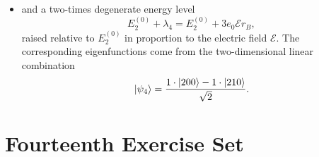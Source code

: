 \documentclass[11pt, a4paper]{article}
\newcommand{\p}{\psi}  %
\newcommand{\E}{\mathcal{E}}  %
\begin{document}
\begin{itemize}
\begin{itemize}
		\item and a two-times degenerate energy level
		\begin{equation*}
			E^{(0)}_{2} + \lambda_{4} = E^{(0)}_{2} + 3 e_{0}\E r_{B},
		\end{equation*}
		raised relative to $ E^{(0)}_{2} $ in proportion to the electric field $ \E $. The corresponding eigenfunctions come from the two-dimensional linear combination
		\begin{equation*}
			\ket{\p_{4}} = \frac{1\cdot \ket{200} - 1\cdot \ket{210}}{\sqrt{2}}.
		\end{equation*}
		
	\end{itemize}
	
\end{itemize}

\section{Fourteenth Exercise Set}
\end{document}
